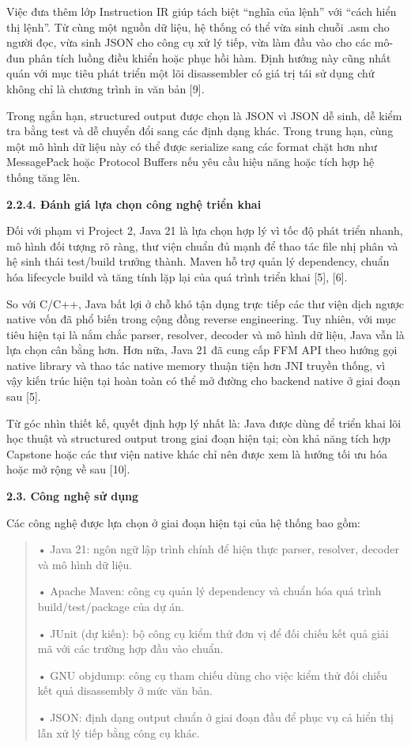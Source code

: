 \documentclass[
]{article}
\begin{document}
Việc đưa thêm lớp Instruction IR giúp tách biệt ``nghĩa của lệnh'' với
``cách hiển thị lệnh''. Từ cùng một nguồn dữ liệu, hệ thống có thể vừa
sinh chuỗi .asm cho người đọc, vừa sinh JSON cho công cụ xử lý tiếp, vừa
làm đầu vào cho các mô-đun phân tích luồng điều khiển hoặc phục hồi hàm.
Định hướng này cũng nhất quán với mục tiêu phát triển một lõi
disassembler có giá trị tái sử dụng chứ không chỉ là chương trình in văn
bản {[}9{]}.

Trong ngắn hạn, structured output được chọn là JSON vì JSON dễ sinh, dễ
kiểm tra bằng test và dễ chuyển đổi sang các định dạng khác. Trong trung
hạn, cùng một mô hình dữ liệu này có thể được serialize sang các format
chặt hơn như MessagePack hoặc Protocol Buffers nếu yêu cầu hiệu năng
hoặc tích hợp hệ thống tăng lên.

\textbf{2.2.4. Đánh giá lựa chọn công nghệ triển khai}

Đối với phạm vi Project 2, Java 21 là lựa chọn hợp lý vì tốc độ phát
triển nhanh, mô hình đối tượng rõ ràng, thư viện chuẩn đủ mạnh để thao
tác file nhị phân và hệ sinh thái test/build trưởng thành. Maven hỗ trợ
quản lý dependency, chuẩn hóa lifecycle build và tăng tính lặp lại của
quá trình triển khai {[}5{]}, {[}6{]}.

So với C/C++, Java bất lợi ở chỗ khó tận dụng trực tiếp các thư viện
dịch ngược native vốn đã phổ biến trong cộng đồng reverse engineering.
Tuy nhiên, với mục tiêu hiện tại là nắm chắc parser, resolver, decoder
và mô hình dữ liệu, Java vẫn là lựa chọn cân bằng hơn. Hơn nữa, Java 21
đã cung cấp FFM API theo hướng gọi native library và thao tác native
memory thuận tiện hơn JNI truyền thống, vì vậy kiến trúc hiện tại hoàn
toàn có thể mở đường cho backend native ở giai đoạn sau {[}5{]}.

Từ góc nhìn thiết kế, quyết định hợp lý nhất là: Java được dùng để triển
khai lõi học thuật và structured output trong giai đoạn hiện tại; còn
khả năng tích hợp Capstone hoặc các thư viện native khác chỉ nên được
xem là hướng tối ưu hóa hoặc mở rộng về sau {[}10{]}.

\textbf{2.3. Công nghệ sử dụng}

Các công nghệ được lựa chọn ở giai đoạn hiện tại của hệ thống bao gồm:

\begin{quote}
• Java 21: ngôn ngữ lập trình chính để hiện thực parser, resolver,
decoder và mô hình dữ liệu.

• Apache Maven: công cụ quản lý dependency và chuẩn hóa quá trình
build/test/package của dự án.

• JUnit (dự kiến): bộ công cụ kiểm thử đơn vị để đối chiếu kết quả giải
mã với các trường hợp đầu vào chuẩn.

• GNU objdump: công cụ tham chiếu dùng cho việc kiểm thử đối chiếu kết
quả disassembly ở mức văn bản.

• JSON: định dạng output chuẩn ở giai đoạn đầu để phục vụ cả hiển thị
lẫn xử lý tiếp bằng công cụ khác.
\end{quote}
\end{document}
